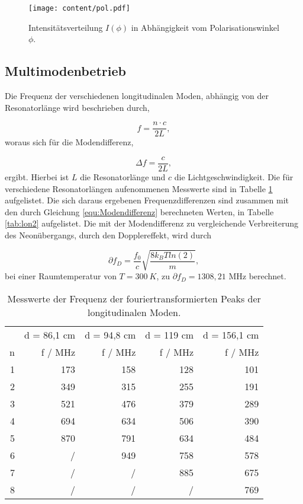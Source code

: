 \begin{figure}[H]
  \centering
  \texttt{[image: content/pol.pdf]}
  \vspace{-10pt}
  \caption{Intensitätsverteilung $I(\phi)$ in Abhängigkeit vom Polarisationswinkel $\phi$.}
  \label{fig:pol}
\end{figure}



\subsection{Multimodenbetrieb}
\label{sec:Multimodenbetrieb}
Die Frequenz der verschiedenen longitudinalen Moden, abhängig von der Resonatorlänge wird beschrieben durch,

\begin{equation}
\label{equ:}
  f = \frac{n \cdot c}{2L},
\end{equation}
 woraus sich für die Modendifferenz,

 \begin{equation}
\label{equ:Modendifferenz}
  \Delta f = \frac{c}{2L},
\end{equation}
ergibt. Hierbei ist $L$ die Resonatorlänge und $c$ die Lichtgeschwindigkeit.
Die für verschiedene Resonatorlängen aufenommenen Messwerte sind in Tabelle \ref{tab:lon} aufgelistet. 
Die sich daraus ergebenen Frequenzdifferenzen sind zusammen mit den durch Gleichung \eqref{equ:Modendifferenz} berechneten Werten, in Tabelle \ref{tab:lon2} aufgelistet.
Die mit der Modendifferenz zu vergleichende Verbreiterung des Neonübergangs, durch den Dopplereffekt, wird durch 

\begin{equation}
  \partial f_D = \frac{f_0}{c} \sqrt{\frac{8 k_B T ln(2)}{m}},
\end{equation}
bei einer Raumtemperatur von $T=300 \: K$, zu 
$\partial f_D = 1308,21$ \: MHz
berechnet. 


\begin{table}[H]
  \centering
  \footnotesize
  \caption{Messwerte der Frequenz der fouriertransformierten Peaks der longitudinalen Moden.}
  \label{tab:lon}
  \begin{tabular}{r r r r r}
  \toprule
      & d = 86,1 \: cm & d = 94,8 \: cm & d = 119 \: cm & d = 156,1 \: cm  \\
    n & f / MHz & f / MHz  & f / MHz & f / MHz \\
  \midrule
    1 & 173 & 158 & 128 & 101 \\
    2 & 349 & 315 & 255 & 191 \\
    3 & 521 & 476 & 379 & 289 \\
    4 & 694 & 634 & 506 & 390 \\
    5 & 870 & 791 & 634 & 484 \\
    6 & /   & 949 & 758 & 578 \\
    7 & /   & /   & 885 & 675 \\
    8 & /   & /   & /   & 769 \\
  \bottomrule
  \end{tabular}
\end{table}


